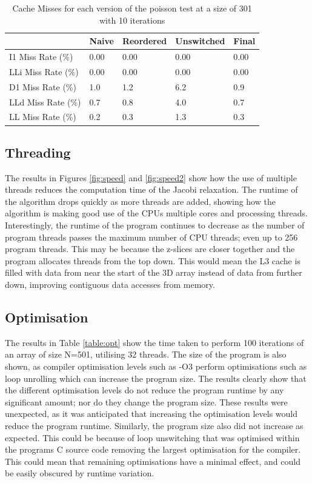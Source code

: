 \documentclass[12pt]{article}
\begin{document}
\begin{table}[H]
    \centering
    \caption{Cache Misses for each version of the poisson test at a size of 301 with 10 iterations}
    \label{table:cache}
    \begin{tabular}{ | m{4cm} | m{2cm} | m{2cm} | m{2cm} | m{2cm} | }
        \hline
        & Naive & Reordered & Unswitched & Final\\
        \hline
        I1 Miss Rate (\%) & 0.00 & 0.00 & 0.00 & 0.00\\
        \hline
        LLi Miss Rate (\%) & 0.00 & 0.00 & 0.00 & 0.00\\
        \hline
        D1 Miss Rate (\%) & 1.0 & 1.2 & 6.2 & 0.9\\
        \hline
        LLd Miss Rate (\%) & 0.7 & 0.8 & 4.0 & 0.7\\
        \hline
        LL Miss Rate (\%) & 0.2 & 0.3 & 1.3 & 0.3\\
        \hline
        
    \end{tabular}
\end{table}

\subsection{Threading}
The results in Figures \ref{fig:speed} and \ref{fig:speed2} show how the use of multiple threads reduces the computation time of the Jacobi relaxation.
The runtime of the algorithm drops quickly as more threads are added, showing how the algorithm is making good use
of the CPUs multiple cores and processing threads. Interestingly, the runtime of the program continues to decrease
as the number of program threads passes the maximum number of CPU threads; even up to 256 program threads. This may
be because the z-slices are closer together and the program allocates threads from the top down. This would mean
the L3 cache is filled with data from near the start of the 3D array instead of data from further down,
improving contiguous data accesses from memory.

\subsection{Optimisation}
The results in Table \ref{table:opt} show the time taken to perform 100 iterations of an array of size N=501,
utilising 32 threads. The size of the program is also shown, as compiler optimisation levels such as -O3 perform
optimisations such as loop unrolling which can increase the program size. The results clearly show that the
different optimisation levels do not reduce the program runtime by any significant amount; nor do they change
the program size. These results were unexpected, as it was anticipated that increasing the optimisation levels
would reduce the program runtime. Similarly, the program size also did not increase as expected. This could be
because of loop unswitching that was optimised within the programs C source code removing the largest optimisation
for the compiler. This could mean that remaining optimisations have a minimal effect, and could be easily
obscured by runtime variation. 
\end{document}
